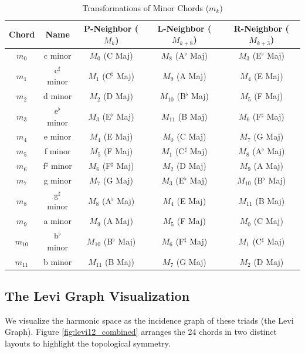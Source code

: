 \documentclass[12pt,letterpaper]{amsart}
\begin{document}
\begin{table}[h!]
    \centering
    \scriptsize
    \renewcommand{\arraystretch}{0.7}
    \caption{\scriptsize Transformations of Minor Chords ($m_k$)}
    \label{tab:minor_neighbors}
    \begin{tabular}{|c|c||c|c|c|}
        \hline
        \textbf{Chord} & \textbf{Name} & \textbf{P-Neighbor} ($M_k$) & \textbf{L-Neighbor} ($M_{k+8}$) & \textbf{R-Neighbor} ($M_{k+3}$) \\
        \hline
        $m_0$ & c minor & $M_0$ (C Maj) & $M_8$ (A$^\flat$ Maj) & $M_3$ (E$^\flat$ Maj) \\
        $m_1$ & c$^\sharp$ minor & $M_1$ (C$^\sharp$ Maj) & $M_9$ (A Maj) & $M_4$ (E Maj) \\
        $m_2$ & d minor & $M_2$ (D Maj) & $M_{10}$ (B$^\flat$ Maj) & $M_5$ (F Maj) \\
        $m_3$ & e$^\flat$ minor & $M_3$ (E$^\flat$ Maj) & $M_{11}$ (B Maj) & $M_6$ (F$^\sharp$ Maj) \\
        $m_4$ & e minor & $M_4$ (E Maj) & $M_0$ (C Maj) & $M_7$ (G Maj) \\
        $m_5$ & f minor & $M_5$ (F Maj) & $M_1$ (C$^\sharp$ Maj) & $M_8$ (A$^\flat$ Maj) \\
        $m_6$ & f$^\sharp$ minor & $M_6$ (F$^\sharp$ Maj) & $M_2$ (D Maj) & $M_9$ (A Maj) \\
        $m_7$ & g minor & $M_7$ (G Maj) & $M_3$ (E$^\flat$ Maj) & $M_{10}$ (B$^\flat$ Maj) \\
        $m_8$ & g$^\sharp$ minor & $M_8$ (A$^\flat$ Maj) & $M_4$ (E Maj) & $M_{11}$ (B Maj) \\
        $m_9$ & a minor & $M_9$ (A Maj) & $M_5$ (F Maj) & $M_0$ (C Maj) \\
        $m_{10}$ & b$^\flat$ minor & $M_{10}$ (B$^\flat$ Maj) & $M_6$ (F$^\sharp$ Maj) & $M_1$ (C$^\sharp$ Maj) \\
        $m_{11}$ & b minor & $M_{11}$ (B Maj) & $M_7$ (G Maj) & $M_2$ (D Maj) \\
        \hline
    \end{tabular}
\end{table}

\subsection{The Levi Graph Visualization}\label{sec43}
We visualize the harmonic space as the incidence graph of these triads (the Levi Graph). Figure \ref{fig:levi12_combined} arranges the 24 chords in two distinct layouts to highlight the topological symmetry.
\end{document}
